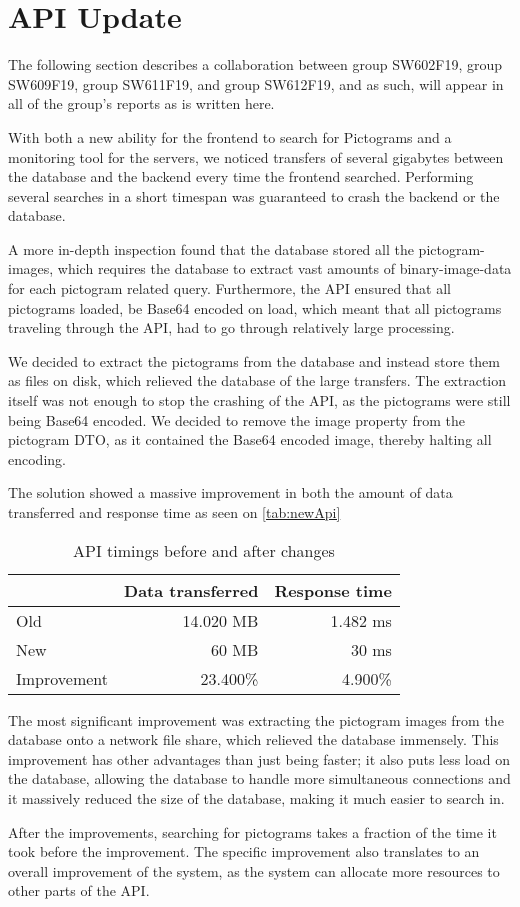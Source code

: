 \section{API Update}\label{CollabAPIUpdate}
The following section describes a collaboration between group SW602F19, group SW609F19, group SW611F19, and group SW612F19, and as such, will appear in all of the group's reports as is written here.

With both a new ability for the frontend to search for Pictograms and a monitoring tool for the servers, we noticed transfers of several gigabytes between the database and the backend every time the frontend searched. Performing several searches in a short timespan was guaranteed to crash the backend or the database.

A more in-depth inspection found that the database stored all the pictogram-images, which requires the database to extract vast amounts of binary-image-data for each pictogram related query. Furthermore, the API ensured that all pictograms loaded, be Base64 encoded on load, which meant that all pictograms traveling through the API, had to go through relatively large processing.

We decided to extract the pictograms from the database and instead store them as files on disk, which relieved the database of the large transfers. The extraction itself was not enough to stop the crashing of the API, as the pictograms were still being Base64 encoded. We decided to remove the image property from the pictogram DTO, as it contained the Base64 encoded image, thereby halting all encoding.

The solution showed a massive improvement in both the amount of data transferred and response time as seen on \autoref{tab:newApi}

\begin{table}[H]
    \centering
    \begin{tabular}{|l|r|r|}
    \hline
                    & Data transferred  & Response time \\ \hline
        Old         & 14.020 MB         & 1.482 ms      \\ \hline 
        New         & 60 MB             & 30 ms         \\ \hline
        Improvement & 23.400\%          & 4.900\%       \\ \hline
    \end{tabular}
    \caption{API timings before and after changes}
    \label{tab:newApi}
\end{table}

The most significant improvement was extracting the pictogram images from the database onto a network file share, which relieved the database immensely. This improvement has other advantages than just being faster; it also puts less load on the database, allowing the database to handle more simultaneous connections and it massively reduced the size of the database, making it much easier to search in.

After the improvements, searching for pictograms takes a fraction of the time it took before the improvement. The specific improvement also translates to an overall improvement of the system, as the system can allocate more resources to other parts of the API.
